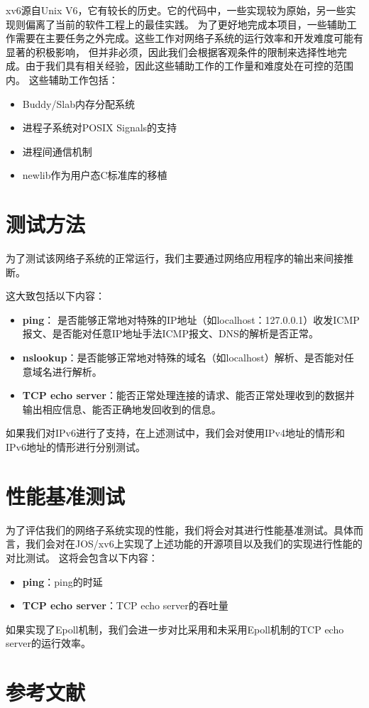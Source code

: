 \documentclass[a4paper,twoside]{article}
\begin{document}
\begin{spacing}{1.2}
xv6源自Unix V6，它有较长的历史。它的代码中，一些实现较为原始，另一些实现则偏离了当前的软件工程上的最佳实践。
为了更好地完成本项目，一些辅助工作需要在主要任务之外完成。这些工作对网络子系统的运行效率和开发难度可能有显著的积极影响，
但并非必须，因此我们会根据客观条件的限制来选择性地完成。由于我们具有相关经验，因此这些辅助工作的工作量和难度处在可控的范围内。
这些辅助工作包括：

\begin{itemize}
	\item Buddy\cite{peterson1977buddy}/Slab\cite{bonwick1994slab}内存分配系统
	\item 进程子系统对POSIX Signals的支持
	\item 进程间通信机制
	\item newlib作为用户态C标准库的移植
\end{itemize}

\section{测试方法}

为了测试该网络子系统的正常运行，我们主要通过网络应用程序的输出来间接推断。

这大致包括以下内容：

\begin{itemize}
	\item \textbf{ping}： 是否能够正常地对特殊的IP地址（如localhost：127.0.0.1）收发ICMP报文、是否能对任意IP地址手法ICMP报文、DNS的解析是否正常。
	\item \textbf{nslookup}：是否能够正常地对特殊的域名（如localhost）解析、是否能对任意域名进行解析。
	\item \textbf{TCP echo server}：能否正常处理连接的请求、能否正常处理收到的数据并输出相应信息、能否正确地发回收到的信息。
\end{itemize}

如果我们对IPv6进行了支持，在上述测试中，我们会对使用IPv4地址的情形和IPv6地址的情形进行分别测试。

\section{性能基准测试}

为了评估我们的网络子系统实现的性能，我们将会对其进行性能基准测试。具体而言，我们会对在JOS/xv6上实现了上述功能的开源项目以及我们的实现进行性能的对比测试。
这将会包含以下内容：

\begin{itemize}
	\item \textbf{ping}：ping的时延
	\item \textbf{TCP echo server}：TCP echo server的吞吐量
\end{itemize}

如果实现了Epoll机制，我们会进一步对比采用和未采用Epoll机制的TCP echo server的运行效率。

\clearpage
\section*{参考文献}





\end{spacing}
\end{document}
